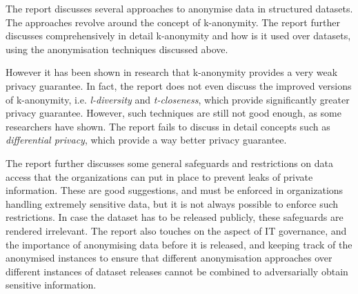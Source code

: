 \documentclass[11pt, a4paper]{article}
\begin{document}
The report discusses several approaches to anonymise data in structured datasets. The approaches revolve around the concept of k-anonymity. The report further discusses comprehensively in detail k-anonymity and how is it used over datasets, using the anonymisation techniques discussed above.

However it has been shown in research that k-anonymity provides a very weak privacy guarantee. In fact, the report does not even discuss the improved versions of k-anonymity, i.e. \textit{l-diversity} and \textit{t-closeness}, which provide significantly greater privacy guarantee. However, such techniques are still not good enough, as some researchers have shown. The report fails to discuss in detail concepts such as \textit{differential privacy}, which provide a way better privacy guarantee.

The report further discusses some general safeguards and restrictions on data access that the organizations can put in place to prevent leaks of private information. These are good suggestions, and must be enforced in organizations handling extremely sensitive data, but it is not always possible to enforce such restrictions. In case the dataset has to be released publicly, these safeguards are rendered irrelevant. The report also touches on the aspect of IT governance, and the importance of anonymising data before it is released, and keeping track of the anonymised instances to ensure that different anonymisation approaches over different instances of dataset releases cannot be combined to adversarially obtain sensitive information.
\end{document}
